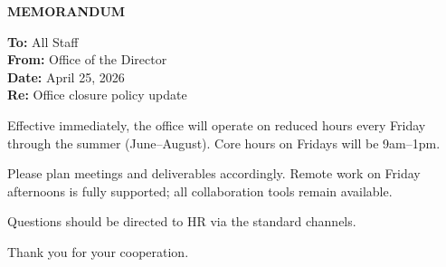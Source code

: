 \documentclass{article}
\begin{document}
\begin{center}
  {\Large\bfseries MEMORANDUM}
\end{center}

\vspace{0.5cm}

\noindent
\textbf{To:} All Staff \\
\textbf{From:} Office of the Director \\
\textbf{Date:} April 25, 2026 \\
\textbf{Re:} Office closure policy update

\vspace{0.5cm}

Effective immediately, the office will operate on reduced hours every Friday through the summer (June--August). Core hours on Fridays will be 9am--1pm.

Please plan meetings and deliverables accordingly. Remote work on Friday afternoons is fully supported; all collaboration tools remain available.

Questions should be directed to HR via the standard channels.

\vspace{0.5cm}

\noindent
Thank you for your cooperation.
\end{document}
